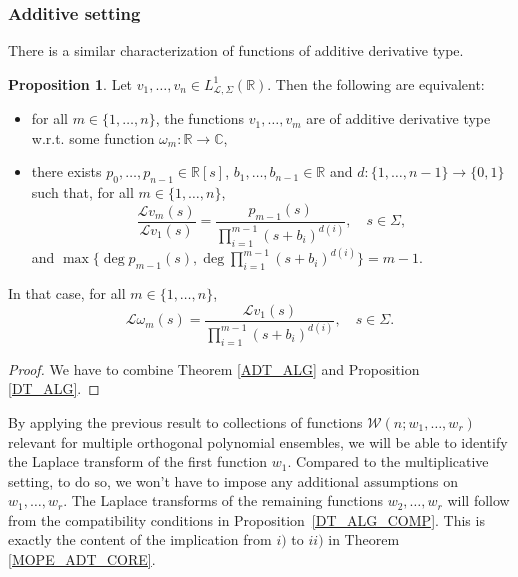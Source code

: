 \documentclass[a4paper,12pt,oneside]{article}
\theoremstyle{definition}
\newtheorem{prop}[defi]{Proposition}
\newcommand{\C}{\mathbb{C}}
\newcommand{\R}{\mathbb{R}}
\newcommand{\om}{\omega}
\newcommand{\LT}[1]{\mathcal{L}#1}
\begin{document}
\subsubsection{Additive setting} \label{CLASS_A}

There is a similar characterization of functions of additive derivative type.

\begin{prop} \label{ADT_SR}
    Let $v_1,\dots,v_n\in L^1_{\LT{},\Sigma}(\R)$. Then the following are equivalent:
    \begin{itemize}
        \item[$i)$] for all $m\in\{1,\dots,n\}$, the functions $v_1,\dots,v_m$ are of additive derivative type w.r.t. some function $\om_m:\R\to\C$,
        \item[$ii)$] there exists $p_0,\dots,p_{n-1}\in\R[s]$, $b_1,\dots,b_{n-1}\in\R$ and $d:\{1,\dots,n-1\}\to\{0,1\}$ such that, for all $m\in\{1,\dots,n\}$,
        $$ \frac{\LT{v_m}(s)}{\LT{v_1}(s)} = \frac{p_{m-1}(s)}{\prod_{i=1}^{m-1}(s+b_i)^{d(i)}},\quad s\in\Sigma, $$
    and $\max\{\deg p_{m-1}(s),\deg \prod_{i=1}^{m-1}(s+b_i)^{d(i)}\}=m-1$.
    \end{itemize}
    In that case, for all $m\in\{1,\dots,n\}$,
    $$ \LT{\om_m}(s) = \frac{\LT{v_1}(s)}{\prod_{i=1}^{m-1} (s+b_i)^{d(i)}},\quad s\in\Sigma.$$
\end{prop}
\begin{proof}
    We have to combine Theorem \ref{ADT_ALG} and Proposition \ref{DT_ALG}.
\end{proof}

By applying the previous result to collections of functions $\mathcal{W}(n;w_1,\dots,w_r)$ relevant for multiple orthogonal polynomial ensembles, we will be able to identify the Laplace transform of the first function $w_1$. Compared to the multiplicative setting, to do so, we won't have to impose any additional assumptions on $w_1,\dots,w_r$. The Laplace transforms of the remaining functions $w_2,\dots,w_r$ will follow from the compatibility conditions in Proposition~\ref{DT_ALG_COMP}. This is exactly the content of the implication from $i)$ to $ii)$ in Theorem \ref{MOPE_ADT_CORE}.
\end{document}
